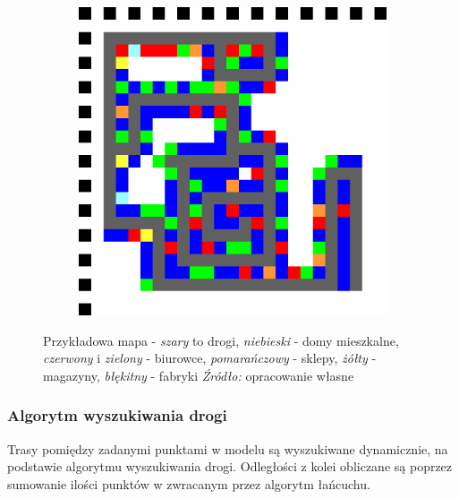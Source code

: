 \documentclass[polish, twoside, 12pt, a4paper]{article}
\theoremstyle{definition}
\theoremstyle{plain}
\theoremstyle{remark}
\begin{document}
\begin{figure}[hbt]
  \centering
  \begin{subfigure}[t]{0.45\textwidth}
    \includegraphics[width=\textwidth]{../mapy/po_lokalizacji_sklepow.png}
  \end{subfigure}
  \captionsetup{margin=10pt,font=small,labelfont=bf,width=.8\textwidth}
  \caption[Przykładowa wygenerowana mapa]{Przykładowa mapa - \textit{szary} to drogi, \textit{niebieski} - domy mieszkalne, \textit{czerwony} i \textit{zielony} - biurowce, \textit{pomarańczowy} - sklepy, \textit{żółty} - magazyny, \textit{błękitny} - fabryki \textit{Źródło:} opracowanie własne}\label{fig:mapa}
\end{figure}


\subsubsection{Algorytm wyszukiwania drogi} 

Trasy pomiędzy zadanymi punktami w modelu są wyszukiwane dynamicznie, na podstawie algorytmu wyszukiwania drogi. Odległości z kolei obliczane są poprzez sumowanie ilości punktów w zwracanym przez algorytm łańcuchu. 
\end{document}
